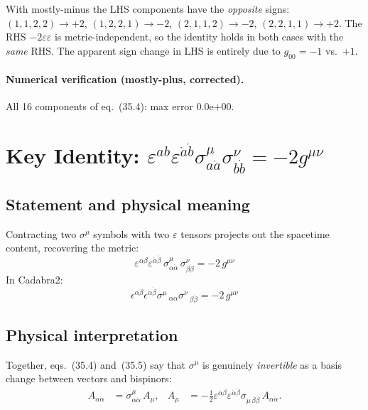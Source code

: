 \documentclass[12pt]{article}
\newcommand{\verified}[1]{\textcolor{verifygreen}{\checkmark\; #1}}
\newcommand{\dal}{\dot\alpha}
\newcommand{\dbe}{\dot\beta}
\begin{document}
\begin{metricnote}
With mostly-minus the LHS components have the \emph{opposite} signs:
$(1,1,2,2)\to+2$,\; $(1,2,2,1)\to-2$,\; $(2,1,1,2)\to-2$,\; $(2,2,1,1)\to+2$.
The RHS $-2\varepsilon\varepsilon$ is metric-independent, so the identity
holds in both cases with the \emph{same} RHS.
The apparent sign change in LHS is entirely due to $g_{00}=-1$ vs.\ $+1$.
\end{metricnote}

\paragraph{Numerical verification (mostly-plus, corrected).}
\verified{All 16 components of eq.~(35.4): max error $0.0$\textrm{e}$+00$.}

\section{Key Identity:
         \texorpdfstring{$\varepsilon^{ab}\varepsilon^{\dot{a}\dot{b}}
         \sigma^\mu_{a\dot{a}}\sigma^\nu_{b\dot{b}} = -2g^{\mu\nu}$}{eq 35.5}
         \quad [eq.~35.5]}

\subsection{Statement and physical meaning}

Contracting two $\sigma^\mu$ symbols with two $\varepsilon$ tensors
projects out the spacetime content, recovering the metric:
\begin{equation}
  \boxed{
    \varepsilon^{\alpha\beta}\varepsilon^{\dot\alpha\dot\beta}\,
    \sigma^\mu_{\alpha\dot\alpha}\,\sigma^\nu_{\beta\dot\beta}
    = -2\,g^{\mu\nu}
  }
  \tag{35.5}
\end{equation}
In Cadabra2:
\[
  \epsilon^{\alpha \beta} \epsilon^{\dal \dbe} \sigma^{\mu}\,_{\alpha \dal} \sigma^{\nu}\,_{\beta \dbe} = -2\,g^{\mu \nu}
\]

\subsection{Physical interpretation}

Together, eqs.~(35.4) and~(35.5) say that $\sigma^\mu$ is genuinely
\emph{invertible} as a basis change between vectors and bispinors:
\begin{align*}
  A_{\alpha\dot\alpha} &= \sigma^\mu_{\alpha\dot\alpha}\,A_\mu, &
  A_\mu &= -\tfrac{1}{2}\varepsilon^{\alpha\beta}\varepsilon^{\dot\alpha\dot\beta}
           \sigma_{\mu\,\beta\dot\beta}\,A_{\alpha\dot\alpha}.
\end{align*}
\end{document}
